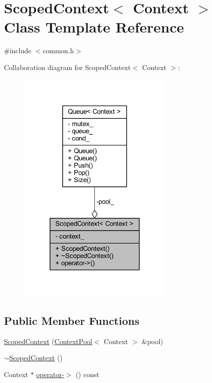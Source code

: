 \hypertarget{class_scoped_context}{}\section{Scoped\+Context$<$ Context $>$ Class Template Reference}
\label{class_scoped_context}


{\ttfamily \#include $<$common.\+h$>$}



Collaboration diagram for Scoped\+Context$<$ Context $>$\+:\nopagebreak
\begin{figure}[H]
\begin{center}
\leavevmode
\includegraphics[width=215pt]{class_scoped_context__coll__graph}
\end{center}
\end{figure}
\subsection*{Public Member Functions}
\begin{DoxyCompactItemize}
\item 
\mbox{\hyperlink{class_scoped_context_a47e87cd0b7ce580d53fbb7f1bb36a4c3}{Scoped\+Context}} (\mbox{\hyperlink{common_8h_a59ab5d85bff9594312b035d548be298f}{Context\+Pool}}$<$ Context $>$ \&pool)
\item 
\mbox{\hyperlink{class_scoped_context_a1bdbdb322975a0ea7d35262385b81476}{$\sim$\+Scoped\+Context}} ()
\item 
Context $\ast$ \mbox{\hyperlink{class_scoped_context_af8a201a083905cf9c02c53d5992e7488}{operator-\/$>$}} () const
\end{DoxyCompactItemize}
